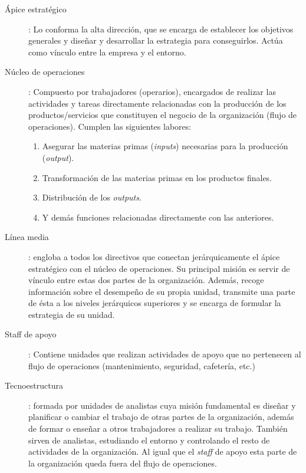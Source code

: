 \documentclass[12pt,a4paper,spanish]{report}
\begin{document}
			\begin{description} 
				\item[Ápice estratégico]: Lo conforma la alta dirección, que se encarga de establecer los objetivos generales y diseñar y desarrollar la estrategia para conseguirlos. Actúa como vínculo entre la empresa y el entorno.

				\item[Núcleo de operaciones]: Compuesto por trabajadores (operarios), encargados de realizar las actividades y tareas directamente relacionadas con la producción de los productos/servicios que constituyen el negocio de la organización (flujo de operaciones). Cumplen las siguientes labores:
				\begin{enumerate}
					\item Asegurar las materias primas (\textcolor[rgb]{0.5,0.1,0.4}{\emph{inputs}}) necesarias para la producción (\textcolor[rgb]{0.5,0.1,0.4}{\emph{output}}).

					\item Transformación de las materias primas en los productos finales.

					\item Distribución de los \textcolor[rgb]{0.5,0.1,0.4}{\emph{outputs}}.

					\item Y demás funciones relacionadas directamente con las anteriores.
				\end{enumerate}

				\item[Línea media]: engloba a todos los directivos que conectan jerárquicamente el ápice estratégico con el núcleo de operaciones. Su principal misión es servir de vínculo entre estas dos partes de la organización. Además, recoge información sobre el desempeño de su propia unidad, transmite una parte de ésta a los niveles jerárquicos superiores y se encarga de formular la estrategia de su unidad.

				\item[Staff de apoyo]: Contiene unidades que realizan actividades de apoyo que no pertenecen al flujo de operaciones (mantenimiento, seguridad, cafetería, etc.)

				\item[Tecnoestructura]: formada por unidades de analistas cuya misión fundamental es diseñar y planificar o cambiar el trabajo de otras partes de la organización, además de formar o enseñar a otros trabajadores a realizar su trabajo. También sirven de analistas, estudiando el entorno y controlando el resto de actividades de la organización. Al igual que el \textcolor[rgb]{0.5,0.1,0.4}{\emph{staff}} de apoyo esta parte de la organización queda fuera del flujo de operaciones.
			\end{description}
\end{document}

